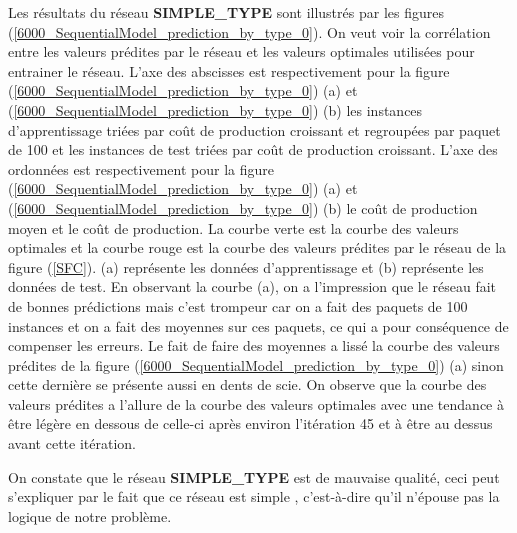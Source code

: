  Les résultats du réseau \textbf{SIMPLE\_TYPE} sont illustrés par les figures  (\ref{6000_SequentialModel_prediction_by_type_0}). On veut voir la corrélation entre les valeurs prédites par le réseau et les valeurs optimales utilisées pour entrainer le réseau. L'axe des abscisses est respectivement pour la figure (\ref{6000_SequentialModel_prediction_by_type_0}) (a) et (\ref{6000_SequentialModel_prediction_by_type_0}) (b) les instances d'apprentissage triées par coût de production croissant et regroupées par paquet de 100 et les instances de test triées par coût de production croissant. L'axe des ordonnées est respectivement pour la figure (\ref{6000_SequentialModel_prediction_by_type_0}) (a) et (\ref{6000_SequentialModel_prediction_by_type_0}) (b) le coût de production moyen et le coût de production. La courbe verte est la courbe des valeurs optimales et la courbe rouge est la courbe des valeurs prédites par le réseau de la figure (\ref{SFC}). (a) représente les données d'apprentissage et (b) représente les données de test. En observant la courbe (a), on a l'impression que le réseau fait de bonnes prédictions mais c'est trompeur car on a fait des paquets de 100 instances et on a fait des moyennes sur ces paquets, ce qui a pour conséquence de compenser les erreurs. Le fait de faire des moyennes a lissé la courbe des valeurs prédites de la figure (\ref{6000_SequentialModel_prediction_by_type_0}) (a) sinon cette dernière se présente aussi en dents de scie. On observe que la courbe des valeurs prédites a l'allure de la courbe des valeurs optimales avec une tendance à être légère en dessous de celle-ci après environ l'itération 45 et à être au dessus avant cette itération.
 
 
On constate que le réseau \textbf{SIMPLE\_TYPE} est de mauvaise qualité, ceci peut s'expliquer par le fait que ce réseau est \og simple \fg{}, c'est-à-dire qu'il n'épouse pas la logique de notre problème.

%
%

